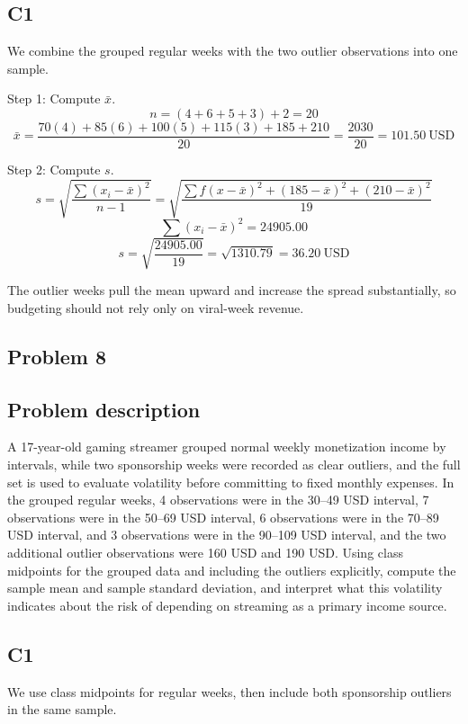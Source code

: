 \begin{ExamProblems}
		\subsection*{C1}
		We combine the grouped regular weeks with the two outlier observations into one sample.

		Step 1: Compute $\bar{x}$.
		\[
		n = (4+6+5+3)+2 = 20
		\]
		\[
		\bar{x} = \frac{70(4)+85(6)+100(5)+115(3)+185+210}{20}
		= \frac{2030}{20}
		= 101.50\ \text{USD}
		\]

		Step 2: Compute $s$.
		\[
		s = \sqrt{\frac{\sum (x_i-\bar{x})^2}{n-1}}
		= \sqrt{\frac{\sum f(x-\bar{x})^2 + (185-\bar{x})^2 + (210-\bar{x})^2}{19}}
		\]
		\[
		\sum (x_i-\bar{x})^2 = 24905.00
		\]
		\[
		s = \sqrt{\frac{24905.00}{19}} = \sqrt{1310.79} = 36.20\ \text{USD}
		\]

		The outlier weeks pull the mean upward and increase the spread substantially, so budgeting should not rely only on viral-week revenue.

		\newpage
		\item
		\subsection*{Problem 8}
		\subsection*{Problem description}
		A 17-year-old gaming streamer grouped normal weekly monetization income by intervals, while two sponsorship weeks were recorded as clear outliers, and the full set is used to evaluate volatility before committing to fixed monthly expenses. In the grouped regular weeks, 4 observations were in the 30--49 USD interval, 7 observations were in the 50--69 USD interval, 6 observations were in the 70--89 USD interval, and 3 observations were in the 90--109 USD interval, and the two additional outlier observations were 160 USD and 190 USD. Using class midpoints for the grouped data and including the outliers explicitly, compute the sample mean and sample standard deviation, and interpret what this volatility indicates about the risk of depending on streaming as a primary income source.

		\subsection*{C1}
		We use class midpoints for regular weeks, then include both sponsorship outliers in the same sample.


\end{ExamProblems}
